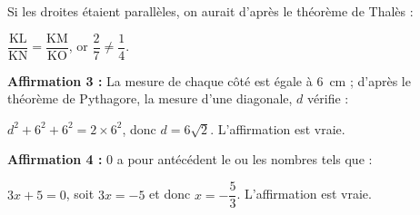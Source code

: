 Si les droites étaient parallèles, on aurait d'après le théorème de Thalès  : 

$\dfrac{\text{KL}}{\text{KN}} = \dfrac{\text{KM}}{\text{KO}}$, or $\dfrac{2}{7} \ne \dfrac{1}{4}$.

\textbf{Affirmation 3 :} La mesure de chaque côté est égale à 6~cm ; d'après le théorème de Pythagore, la mesure d'une diagonale, $d$ vérifie :

$d^2 + 6^2 + 6^2 = 2 \times 6^2$, donc $d = 6\sqrt{2}$. L'affirmation est vraie.

\textbf{Affirmation 4 :}  $0$ a pour antécédent le ou les nombres tels que :

$3x + 5 = 0$, soit $3x = - 5$ et donc $x = - \dfrac{5}{3}$.  L'affirmation est vraie. 
\vspace{0,5cm}

